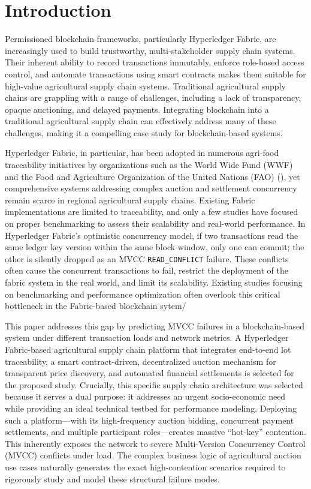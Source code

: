 \documentclass[12pt]{article}
\begin{document}
	
	\newpage
	\section{Introduction}

Permissioned blockchain frameworks, particularly Hyperledger Fabric, are increasingly used to build trustworthy, multi-stakeholder supply chain systems. Their inherent ability to record transactions immutably,  enforce role-based access control, and automate transactions using smart contracts makes them suitable for high-value agricultural supply chain systems. Traditional agricultural supply chains are grappling with a range of challenges, including a lack of transparency, opaque auctioning, and delayed payments. Integrating blockchain into a traditional agricultural supply chain can effectively address many of these challenges, making it a compelling case study for blockchain-based systems.

Hyperledger Fabric, in particular, has been adopted in numerous agri-food traceability initiatives by organizations such as the World Wide Fund (WWF) and the Food and Agriculture Organization of the United Nations (FAO) (\citet{world_wildlife_fund_wwf_wwf_2019}), yet comprehensive systems addressing complex auction and settlement concurrency remain scarce in regional agricultural supply chains. Existing Fabric implementations are limited to traceability, and only a few studies have focused on proper benchmarking to assess their scalability and real-world performance.  In Hyperledger Fabric's optimistic concurrency model, if two transactions read the same ledger key version within the same block window, only one can commit; the other is silently dropped as an MVCC \texttt{READ\_CONFLICT} failure. These conflicts often cause the concurrent transactions to fail, restrict the deployment of the fabric system in the real world, and limit its scalability. Existing studies focusing on benchmarking and performance optimization often overlook this critical bottleneck in the Fabric-based blockchain sytem/

This paper addresses this gap by predicting MVCC failures in a blockchain-based system under different transaction loads and network metrics. A Hyperledger Fabric-based agricultural supply chain platform that integrates end-to-end lot traceability, a smart contract-driven, decentralized auction mechanism for transparent price discovery, and automated financial settlements is selected for the proposed study. Crucially, this specific supply chain architecture was selected because it serves a dual purpose: it addresses an urgent socio-economic need while providing an ideal technical testbed for performance modeling. Deploying such a platform---with its high-frequency auction bidding, concurrent payment settlements, and multiple participant roles---creates massive ``hot-key'' contention. This inherently exposes the network to severe Multi-Version Concurrency Control (MVCC) conflicts under load. The complex business logic of agricultural auction use cases naturally generates the exact high-contention scenarios required to rigorously study and model these structural failure modes.
\end{document}
